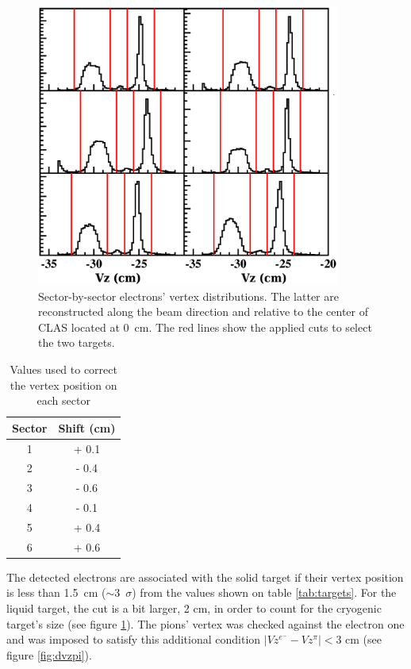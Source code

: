 \begin{figure}[p]
\centering
\includegraphics[width=10cm] {chap5-fig/Vertex_el_data.png}
\caption {Sector-by-sector electrons' vertex distributions. The latter are reconstructed along the beam direction and relative to the center of CLAS located at 0~cm. The red lines show the applied cuts to select the two targets.}
\label{vertex}
\end{figure}

\begin{table}[p]
  \centering
  \begin{tabular}{@{} cc @{}}
    \hline
    Sector & Shift (cm) \\ 
    \hline
    1 & + 0.1 \\ 
    2 & - 0.4 \\ 
    3 & - 0.6 \\ 
    4 & - 0.1 \\ 
    5 & + 0.4 \\ 
    6 & + 0.6 \\ 
    \hline
  \end{tabular}
  \caption{Values used to correct the vertex position on each sector}
  \label{tab:vertex}
\end{table}

The detected electrons are associated with the solid target if their vertex 
position is less than 1.5~cm ($\sim$3~$\sigma$) from the values shown on table 
\ref{tab:targets}. For the liquid target, the cut is a bit larger, 2 cm, in order to count for the cryogenic target's size (see figure \ref{vertex}). The pions' vertex was checked against the electron one and was imposed to satisfy this additional condition $| Vz^{e^-} - Vz^{\pi} | < 3$ cm (see figure \ref{fig:dvzpi}).

